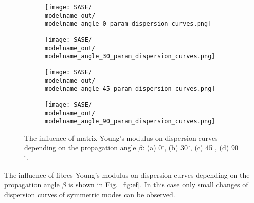 \documentclass[preprint,12pt]{elsarticle}
\begin{document}
\begin{figure} [h!]
	\centering
	\newcommand{\modelname}{SASE4}
	\begin{subfigure}[b]{0.49\textwidth}
		\centering
		\texttt{[image: SASE/\\modelname\_out/\\modelname\_angle\_0\_param\_dispersion\_curves.png]}
		\caption{}
		\label{fig:em0}
	\end{subfigure}
	\hfill
	\begin{subfigure}[b]{0.49\textwidth}
		\centering
		\texttt{[image: SASE/\\modelname\_out/\\modelname\_angle\_30\_param\_dispersion\_curves.png]}
		\caption{}
		\label{fig:em30}
	\end{subfigure}
	\begin{subfigure}[b]{0.49\textwidth}
		\centering
		\texttt{[image: SASE/\\modelname\_out/\\modelname\_angle\_45\_param\_dispersion\_curves.png]}
		\caption{}
		\label{fig:em45}
	\end{subfigure}
	\hfill
	\begin{subfigure}[b]{0.49\textwidth}
		\centering
		\texttt{[image: SASE/\\modelname\_out/\\modelname\_angle\_90\_param\_dispersion\_curves.png]}
		\caption{}
		\label{fig:em90}
	\end{subfigure}
	\caption{The influence of matrix Young's modulus on dispersion curves depending on the propagation angle $\beta$: (a) 0$^{\circ}$, (b) 30$^{\circ}$, (c) 45$^{\circ}$, (d) 90$^{\circ}$.} 
	\label{fig:em}
\end{figure}
\clearpage

The influence of fibres Young's modulus on dispersion curves depending on the propagation angle $\beta$ is shown in Fig.~\ref{fig:ef}. In this case only small changes of dispersion curves of symmetric modes can be observed. 
\end{document}
